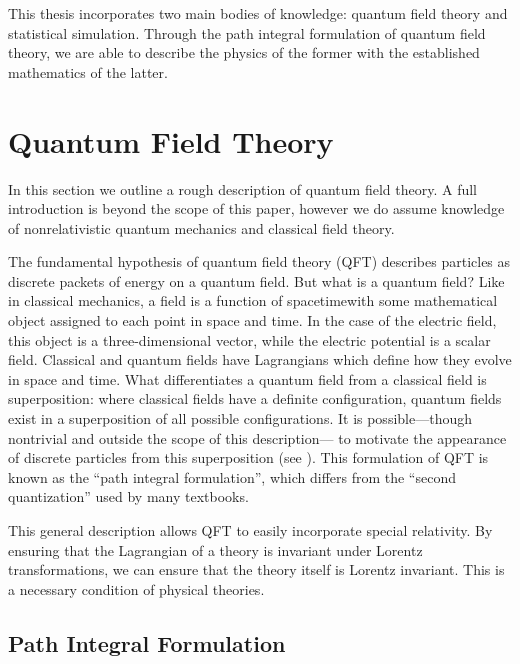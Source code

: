This thesis incorporates two main bodies of knowledge: quantum field theory and statistical simulation. Through the path integral formulation of quantum field theory, we are able to describe the physics of the former with the established mathematics of the latter.

\section{Quantum Field Theory}

In this section we outline a rough description of quantum field theory. A full introduction is beyond the scope of this paper, however we do assume knowledge of nonrelativistic quantum mechanics and classical field theory.

The fundamental hypothesis of quantum field theory (QFT) describes particles as discrete packets of energy on a quantum field. But what is a quantum field? Like in classical mechanics, a field is a function of spacetimewith some mathematical object assigned to each point in space and time. In the case of the electric field, this object is a three-dimensional vector, while the electric potential is a scalar field. Classical and quantum fields have Lagrangians which define how they evolve in space and time. What differentiates a quantum field from a classical field is superposition: where classical fields have a definite configuration, quantum fields exist in a superposition of all possible configurations. It is possible---though nontrivial and outside the scope of this description--- to motivate the appearance of discrete particles from this superposition (see \cite{zee2010}). This formulation of QFT is known as the ``path integral formulation'', which differs from the ``second quantization'' used by many textbooks.

This general description allows QFT to easily incorporate special relativity. By ensuring that the Lagrangian of a theory is invariant under Lorentz transformations, we can ensure that the theory itself is Lorentz invariant. This is a necessary condition of physical theories. 

 
\subsection{Path Integral Formulation}
\label{sec:pathintegral}

